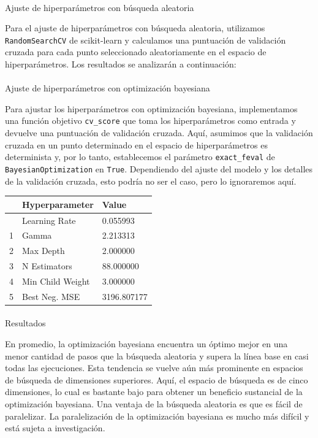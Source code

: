 \documentclass[
  12pt,
  letterpaper,
  DIV=11,
  numbers=noendperiod]{scrartcl}
\makeatletter
\let\oldparagraph\paragraph
\renewcommand{\paragraph}{
    \@ifstar
      \xxxParagraphStar
      \xxxParagraphNoStar
  }
\newcommand{\xxxParagraphStar}[1]{\oldparagraph*{#1}\mbox{}}
\newcommand{\xxxParagraphNoStar}[1]{\oldparagraph{#1}\mbox{}}
\makeatother
\begin{document}
\paragraph{Ajuste de hiperparámetros con búsqueda
aleatoria}\label{ajuste-de-hiperparuxe1metros-con-buxfasqueda-aleatoria}

Para el ajuste de hiperparámetros con búsqueda aleatoria, utilizamos
\texttt{RandomSearchCV} de scikit-learn y calculamos una puntuación de
validación cruzada para cada punto seleccionado aleatoriamente en el
espacio de hiperparámetros. Los resultados se analizarán a continuación:

\paragraph{Ajuste de hiperparámetros con optimización
bayesiana}\label{ajuste-de-hiperparuxe1metros-con-optimizaciuxf3n-bayesiana}

Para ajustar los hiperparámetros con optimización bayesiana,
implementamos una función objetivo \texttt{cv\_score} que toma los
hiperparámetros como entrada y devuelve una puntuación de validación
cruzada. Aquí, asumimos que la validación cruzada en un punto
determinado en el espacio de hiperparámetros es determinista y, por lo
tanto, establecemos el parámetro \texttt{exact\_feval} de
\texttt{BayesianOptimization} en \texttt{True}. Dependiendo del ajuste
del modelo y los detalles de la validación cruzada, esto podría no ser
el caso, pero lo ignoraremos aquí.

\begin{longtable}[]{@{}lll@{}}
\toprule\noalign{}
& Hyperparameter & Value \\
\midrule\noalign{}
\endhead
\bottomrule\noalign{}
\endlastfoot
0 & Learning Rate & 0.055993 \\
1 & Gamma & 2.213313 \\
2 & Max Depth & 2.000000 \\
3 & N Estimators & 88.000000 \\
4 & Min Child Weight & 3.000000 \\
5 & Best Neg. MSE & 3196.807177 \\
\end{longtable}

\paragraph{Resultados}\label{resultados}

En promedio, la optimización bayesiana encuentra un óptimo mejor en una
menor cantidad de pasos que la búsqueda aleatoria y supera la línea base
en casi todas las ejecuciones. Esta tendencia se vuelve aún más
prominente en espacios de búsqueda de dimensiones superiores. Aquí, el
espacio de búsqueda es de cinco dimensiones, lo cual es bastante bajo
para obtener un beneficio sustancial de la optimización bayesiana. Una
ventaja de la búsqueda aleatoria es que es fácil de paralelizar. La
paralelización de la optimización bayesiana es mucho más difícil y está
sujeta a investigación.
\end{document}
